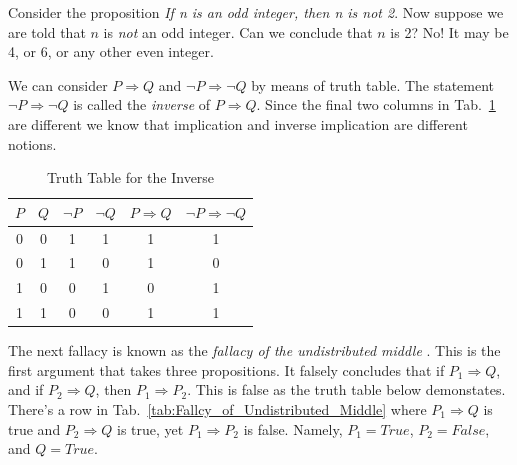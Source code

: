         \begin{example}
            Consider the proposition
            \textit{If n is an odd integer, then n is not 2}. Now suppose we are
            told that $n$ is \textit{not} an odd integer. Can we conclude that
            $n$ is 2? No! It may be 4, or 6, or any other even integer.
        \end{example}
        We can consider $P\Rightarrow{Q}$ and $\neg{P}\Rightarrow\neg{Q}$ by
        means of truth table. The statement $\neg{P}\Rightarrow\neg{Q}$ is
        called the \textit{inverse} of $P\Rightarrow{Q}$. Since the final two
        columns in Tab.~\ref{tab:Truth_Table_Inverse} are different we know that
        implication and inverse implication are different notions.
        \begin{table}[H]
            \centering
            \captionsetup{type=table}
            \begin{tabular}{c|c|c|c|c|c}
                $P$&$Q$&$\neg{P}$&$\neg{Q}$&$P\Rightarrow{Q}$
                                           &$\neg{P}\Rightarrow\neg{Q}$\\
                \hline
                0&0&1&1&1&1\\
                0&1&1&0&1&0\\
                1&0&0&1&0&1\\
                1&1&0&0&1&1
            \end{tabular}
            \caption{Truth Table for the Inverse}
            \label{tab:Truth_Table_Inverse}
        \end{table}
        \par\hfill\par
        The next fallacy is known as the
        \textit{fallacy of the undistributed middle}%
        . This is the first
        argument that takes three propositions. It falsely concludes that
        if $P_{1}\Rightarrow{Q}$, and if $P_{2}\Rightarrow{Q}$, then
        $P_{1}\Rightarrow{P}_{2}$. This is false as the truth table below
        demonstates. There's a row in
        Tab.~\ref{tab:Fallcy_of_Undistributed_Middle} where
        $P_{1}\Rightarrow{Q}$ is true and $P_{2}\Rightarrow{Q}$ is true, yet
        $P_{1}\Rightarrow{P}_{2}$ is false. Namely, $P_{1}=True$,
        $P_{2}=False$, and $Q=True$.
